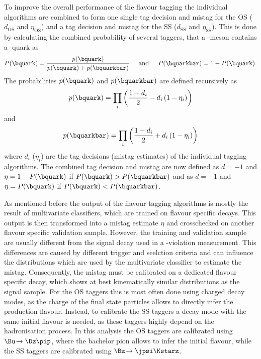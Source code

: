 To improve the overall performance of the flavour tagging the individual algorithms are combined to form one single tag decision and mistag for the OS ($d_{\text{OS}}$ and $\eta_{\text{OS}}$) and a tag decision and mistag for the SS ($d_{\text{SS}}$ and $\eta_{\text{SS}}$).
This is done by calculating the combined probability of several taggers, that a \B-meson contains a \bquark-quark as
\begin{equation}
P(\bquark)=\frac{p(\bquark)}{p(\bquark)+p(\bquarkbar)}\hspace{0.5cm}\text{and}\hspace{0.5cm}P(\bquarkbar)=1-P(\bquark).
\end{equation}
The probabilities $p(\bquark)$ and $p(\bquarkbar)$ are defined recursively as
\begin{equation}
p(\bquark)=\prod_{i}\left(\frac{1+d_i}{2}-d_i\left(1-\eta_i\right)\right)
\end{equation}
and
\begin{equation}
p(\bquarkbar)=\prod_{i}\left(\frac{1-d_i}{2}+d_i\left(1-\eta_i\right)\right)
\end{equation}
where $d_i$ ($\eta_i$) are the tag decisions (mistag estimates) of the individual tagging algorithms.
The combined tag decision and mistag are now defined as $d=-1$ and $\eta=1-P(\bquark)$ if $P(\bquark)>P(\bquarkbar)$ and as $d=+1$ and $\eta=P(\bquark)$ if $P(\bquark)<P(\bquarkbar)$.

As mentioned before the output of the flavour tagging algorithms is mostly the result of multivariate classifiers, which are trained on flavour specific \B decays.
This output is then transformed into a mistag estimate $\eta$ and crosschecked on another flavour specific validation sample.
However, the training and validation sample are usually different from the signal decay used in a \CP-violation measurement.
This differences are caused by different trigger and seelction criteria and can influence the distributions which are used by the multivariate classifier to estimate the mistag.
Consequently, the mistag must be calibrated on a dedicated flavour specific decay, which shows at best kinematically similar distributions as the signal sample.
For the OS taggers this is most often done using charged decay modes, as the charge of the final state particles allows to directly infer the production flavour.
Instead, to calibrate the SS taggers a decay mode with the same initial \B flavour is needed, as these taggers highly depend on the hadronisation process.
In this analysis the OS taggers are calibrated using $\Bu\!\to\Dz\pip$, where the bachelor pion allows to infer the initial flavour, while the SS taggers are calibrated using $\Bz\!\to\jpsi\Kstarz$.

